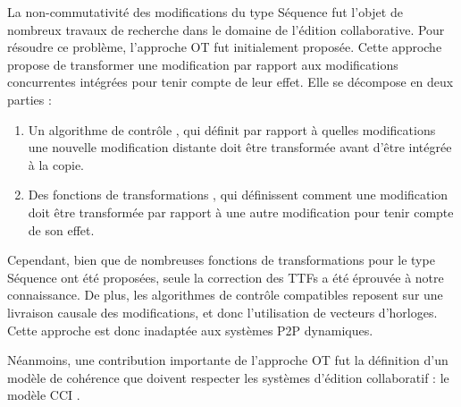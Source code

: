 La non-commutativité des modifications du type Séquence fut l'objet de nombreux travaux de recherche dans le domaine de l'édition collaborative.
Pour résoudre ce problème, l'approche \ac{OT} \cite{1989-grove-ellis-gibbs, 1998-ot-issues-algorithms-achievements-sun} fut initialement proposée.
Cette approche propose de transformer une modification par rapport aux modifications concurrentes intégrées pour tenir compte de leur effet.
Elle se décompose en deux parties :
\begin{enumerate}
  \item Un algorithme de contrôle \cite{1996-adopted-ressel-nitsch-ruhland-gunzenhauser, 1996-reduce-sun-yang-zhang-chen, 2009-cot-sun}, qui définit par rapport à quelles modifications une nouvelle modification distante doit être transformée avant d'être intégrée à la copie.
  \item Des fonctions de transformations , qui définissent comment une modification doit être transformée par rapport à une autre modification pour tenir compte de son effet.
\end{enumerate}

Cependant, bien que de nombreuses fonctions de transformations pour le type Séquence ont été proposées, seule la correction des \acfp{TTF} \cite{2006-tombstone-transformation-functions-oster} a été éprouvée à notre connaissance.
De plus, les algorithmes de contrôle compatibles reposent sur une livraison causale des modifications, et donc l'utilisation de vecteurs d'horloges.
Cette approche est donc inadaptée aux systèmes \ac{P2P} dynamiques.

Néanmoins, une contribution importante de l'approche \ac{OT} fut la définition d'un modèle de cohérence que doivent respecter les systèmes d'édition collaboratif : le modèle \ac{CCI} \cite{1998-cci-sun}.

